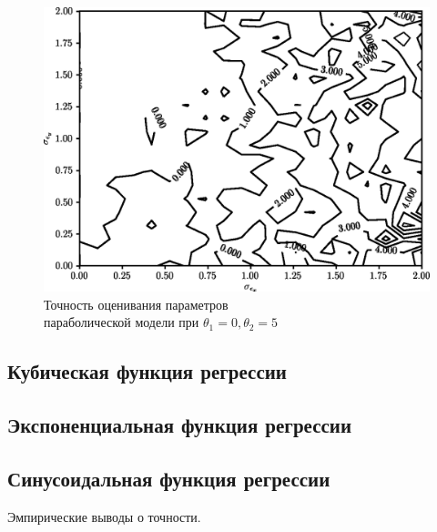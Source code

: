 \begin{figure}[h!]
  \centering
  \includegraphics[width=135mm]{fig/nonlinear/quadratic/alpha-0_beta-5.png}
  \caption{
    Точность оценивания параметров \\
    параболической модели при \( \theta_1 = 0, \theta_2 = 5 \)
  }\label{fig:comparison_nonlinear_quadratic_alpha-0_beta-5}
\end{figure}



\subsection{Кубическая функция регрессии}

\subsection{Экспоненциальная функция регрессии}

\subsection{Синусоидальная функция регрессии}

Эмпирические выводы о точности.